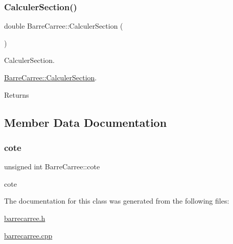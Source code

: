 \subsubsection{\texorpdfstring{Calculer\+Section()}{CalculerSection()}}
{\footnotesize\ttfamily double Barre\+Carree\+::\+Calculer\+Section (\begin{DoxyParamCaption}{ }\end{DoxyParamCaption})}



Calculer\+Section. 

\hyperlink{class_barre_carree_af525caec8240a9e7005f6da35e9ecceb}{Barre\+Carree\+::\+Calculer\+Section}.

\begin{DoxyReturn}{Returns}

\end{DoxyReturn}


\subsection{Member Data Documentation}
\mbox{\label{class_barre_carree_aae1653a13278ff6701112bf3a0345208}} 
\subsubsection{\texorpdfstring{cote}{cote}}
{\footnotesize\ttfamily unsigned int Barre\+Carree\+::cote\hspace{0.3cm}{\ttfamily [private]}}



cote 



The documentation for this class was generated from the following files\+:\begin{DoxyCompactItemize}
\item 
\hyperlink{barrecarree_8h}{barrecarree.\+h}\item 
\hyperlink{barrecarree_8cpp}{barrecarree.\+cpp}\end{DoxyCompactItemize}
